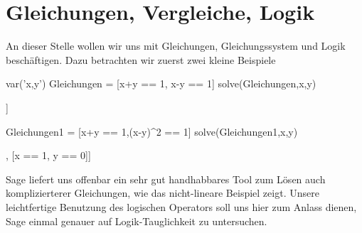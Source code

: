 \documentclass[fontsize=12pt,paper=a4,twoside,bibtotoc,idxtotoc,
liststotoc,pagesize,BCOR1.2cm,DIV15,chapterprefix,pagesize=pdftex]{scrbook}
\theoremstyle{plain}
\theoremstyle{definition}
\theoremstyle{remark}
\begin{document}
\section{Gleichungen, Vergleiche, Logik}
An dieser Stelle wollen wir uns mit Gleichungen, Gleichungssystem und Logik beschäftigen. Dazu betrachten wir zuerst zwei kleine Beispiele 
\begin{sagein}
var('x,y')
Gleichungen = [x+y == 1, x-y == 1]
solve(Gleichungen,x,y)
\end{sagein}
\begin{sage}
[[x == 1, y == 0]]
\end{sage}
\begin{sagein}
Gleichungen1 = [x+y == 1,(x-y)^2 == 1]
solve(Gleichungen1,x,y)
\end{sagein}
\begin{sage}
[[x == 0, y == 1], [x == 1, y == 0]]
\end{sage}
Sage liefert uns offenbar ein sehr gut handhabbares Tool zum Lösen auch komplizierterer Gleichungen, wie das nicht-lineare Beispiel zeigt.
Unsere leichtfertige Benutzung des logischen Operators {\color{blue} \verb == } soll uns hier zum Anlass dienen, Sage einmal genauer auf 
Logik-Tauglichkeit zu untersuchen.
\end{document}
